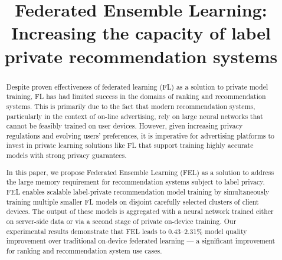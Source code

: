 \documentclass{article}
\title{Federated Ensemble Learning: Increasing the capacity of label private recommendation systems}
\begin{document}
\maketitle
\begin{abstract}
\vspace{-0.25cm}
Despite proven effectiveness of federated learning (FL) as a solution to private model training, FL has had limited success in the domains of ranking and recommendation systems. This is primarily due to the fact that modern recommendation systems, particularly in the context of on-line advertising, rely on large neural networks that cannot be feasibly trained on user devices.
However, given increasing privacy regulations and evolving users' preferences, it is imperative for advertising platforms to invest in private learning solutions like FL that support training highly accurate models with strong privacy guarantees.

In this paper, we propose Federated Ensemble Learning (FEL) as a solution to address the large memory requirement for recommendation systems subject to label privacy. FEL enables scalable label-private recommendation model training by simultaneously training multiple smaller FL models on disjoint carefully selected clusters of client devices. The output of these models is aggregated with a neural network trained  either on server-side data or via a second stage of private on-device training. Our experimental results demonstrate that FEL leads to 0.43--2.31\% model quality improvement over traditional on-device federated learning --- a significant improvement for ranking and recommendation system use cases. 



\end{abstract}
\end{document}
